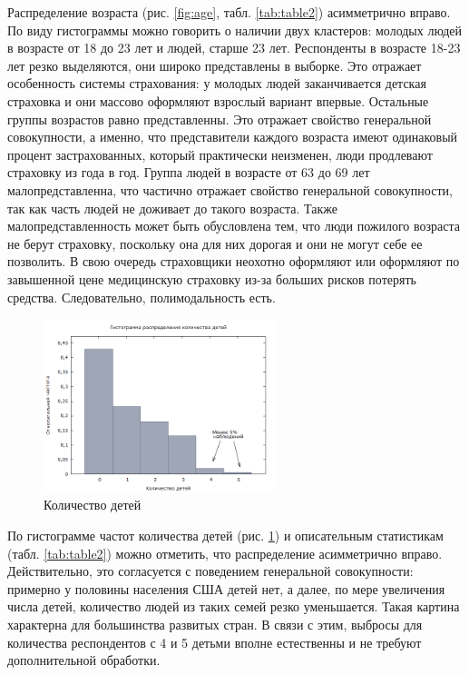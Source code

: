 \documentclass[a4paper,12pt]{article}
\begin{document}
Распределение возраста (рис. \ref{fig:age}, табл. \ref{tab:table2}) асимметрично вправо. По виду гистограммы можно говорить о наличии двух кластеров: молодых людей в возрасте от 18 до 23 лет и людей, старше 23 лет. Респонденты в возрасте 18-23 лет резко выделяются, они широко представлены в выборке. Это отражает особенность системы страхования: у молодых людей заканчивается детская страховка и они массово оформляют взрослый вариант впервые. Остальные группы возрастов равно представленны. Это отражает свойство генеральной совокупности, а именно, что представители каждого возраста имеют одинаковый процент застрахованных, который практически неизменен, люди продлевают страховку из года в год. Группа людей в возрасте от 63 до 69 лет малопредставленна, что частично отражает свойство генеральной совокупности, так как часть людей не доживает до такого возраста. Также малопредставленность может быть обусловлена тем, что люди пожилого возраста не берут страховку, поскольку она для них дорогая и они не могут себе ее позволить. В свою очередь страховщики неохотно оформляют или оформляют по завышенной цене медицинскую страховку из-за больших рисков потерять средства. Следовательно, полимодальность есть.

\begin{figure}[H]
	\includegraphics[width=0.6\textwidth]{../[graphics]/children.png}
	\centering
	\caption{Количество детей}
	\label{fig:children}
\end{figure}

По гистограмме частот количества детей (рис. \ref{fig:children}) и описательным статистикам (табл. \ref{tab:table2}) можно отметить, что распределение асимметрично вправо. Действительно, это согласуется с поведением генеральной совокупности: примерно у половины населения США детей нет, а далее, по мере увеличения числа детей, количество людей из таких семей резко уменьшается. Такая картина характерна для большинства развитых стран. В связи с этим, выбросы для количества респондентов с 4 и 5 детьми вполне естественны и не требуют дополнительной обработки.
\end{document}
